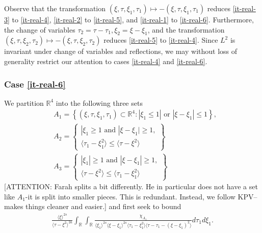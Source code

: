 \documentclass[12pt,reqno]{amsart}
\numberwithin{equation}{section}  %
\numberwithin{figure}{section}
\newcommand{\rr}{\mathbb{R}}
\theoremstyle{plain}
\theoremstyle{definition}
\theoremstyle{remark}
\begin{document}
%
%
Observe that the transformation $(\xi, \tau, \xi_{1}, \tau_{1}) \mapsto -(\xi, \tau,
\xi_{1}, \tau_{1})$ reduces \eqref{it-real-3} to \eqref{it-real-4}, \eqref{it-real-2} to
\eqref{it-real-5}, and \eqref{it-real-1} to \eqref{it-real-6}. Furthermore, the change of
variables $\tau_{2} = \tau - \tau_{1}, \xi_{2} = \xi - \xi_{1}$, and the
transformation $(\xi, \tau, \xi_{2}, \tau_{2}) \mapsto - (\xi, \tau, \xi_{2},
\tau_{2})$ reduces \eqref{it-real-5} to \eqref{it-real-4}. Since $L^{2}$ is invariant
under change of variables and reflections, we may without loss of generality
restrict our attention to cases \eqref{it-real-4} and \eqref{it-real-6}.
 \subsubsection{Case \eqref{it-real-6}} 
\label{sssec:case-it-real-6}
We partition $\rr^{4}$ into the following three sets 
%
%
\begin{equation*}
\begin{split}
  & A_{1} = \left\{ (\xi, \tau, \xi_{1}, \tau_{1}) \subset \rr^{4}: |
  \xi_{1} \le 1 | \text{ or } | \xi - \xi_{1} | \le 1 \right\},
  \\
  & A_{2} = 
  \begin{Bmatrix}
    | \xi_{1} \ge 1 \text{ and } | \xi - \xi_{1} | \ge 1,
    \\
    \langle \tau_{1} - \xi_{1}^{2} \rangle  \le \langle \tau -
  \xi^{2} \rangle
\end{Bmatrix}
  \\
  & A_{3} = 
  \begin{Bmatrix}
    | \xi_{1} | \ge 1 \text{ and } | \xi - \xi_{1} | \ge 1,
    \\
    \langle \tau - \xi^{2} \rangle  \le \langle \tau_{1} - \xi_{1}^{2} \rangle 
  \end{Bmatrix}
\end{split}
\end{equation*}
%
[ATTENTION: Farah splits a bit differently. He in particular does not have a set
like $A_1$-it is split into smaller pieces. This is redundant. Instead,  we follow KPV--makes things cleaner and easier.]
and first seek to bound
%
%
\begin{equation}
  \label{case-1-region-1}
  \begin{split}
    \frac{ \langle \xi
    \rangle ^{2s}}{\langle \tau - \xi^{2} \rangle ^{2a}}
    \int_{\rr} \int_{\rr} \frac{\chi_{A_{1}}}{ \langle \xi_{1} \rangle ^{2s} \langle \xi-\xi_{1} \rangle ^{2s} 
    \langle \tau_{1} - \xi_{1}^{2} \rangle \langle  \tau - \tau_{1} -
    (\xi - \xi_{1})^{2} \rangle }
    d \tau_1 d \xi_{1}.
  \end{split}
\end{equation}
\end{document}
